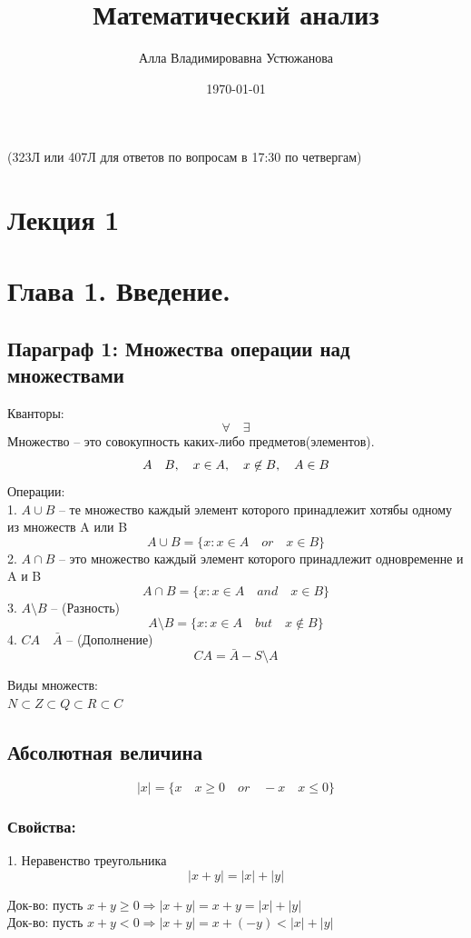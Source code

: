 \documentclass[a4paper, 12pt]{article}
\title{Математический анализ}
\author{Алла Владимировавна Устюжанова}
\date{\today}
\begin{document}
\sffamily
\maketitle
(323Л или 407Л для ответов по вопросам в 17:30 по четвергам)
\section*{Лекция 1}

\section{Глава 1. Введение. }
\subsection{Параграф 1: Множества операции над множествами}
Кванторы:
\[
	\forall \quad \exists
\]
Множество -- это совокупность каких-либо предметов(элементов).
\[
	A \quad B , \\\quad
	x \in A,\\ \quad
	x \not\in B,	\\\quad
	A \in B\\
\]
Операции: \\
1. $ A \cup B $ -- те множество каждый элемент которого принадлежит хотябы одному из множеств A или B \[
	A \cup B = \{x:x \in A \quad or \quad x \in B\}	
\]
2. $ A \cap B $ -- это множество каждый элемент которого принадлежит одновременне и A и B \[
	 A \cap B = \{x: x\in A \quad and \quad x \in B\}	
\]
3. $ A \setminus B $ -- (Разность)\[
	A \setminus B = \{x: x\in A \quad but \quad x\not\in B\}	
\]
4. $ CA \quad\bar{A} $ -- (Дополнение) \[
	CA = \bar{A} - S\setminus A	
\]


Виды множеств:\\
$ N \subset Z \subset Q \subset R \subset C $\\

\subsection{Абсолютная величина}
\[
	|x| = \{x \quad x \geq 0 \quad or \quad -x \quad x\leq 0\}	
\]
\subsubsection*{Свойства:}
1. Неравенство треугольника \[
 |x+y| = |x| + |y|	
\]
\begin{mdframed}[backgroundcolor=blue!20] 
       Док-во: пусть $  x+y \geq 0\Rightarrow |x+y| = x+y=|x|+|y|$\\
       Док-во: пусть $  x+y < 0\Rightarrow |x+y| = x+(-y)<|x|+|y|$
    \end{mdframed}
\end{document}
